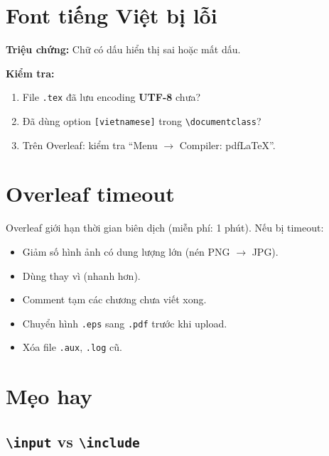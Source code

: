 \section{Font tiếng Việt bị lỗi}

\textbf{Triệu chứng:} Chữ có dấu hiển thị sai hoặc mất dấu.

\textbf{Kiểm tra:}
\begin{enumerate}
  \item File \texttt{.tex} đã lưu encoding \textbf{UTF-8} chưa?
  \item Đã dùng option \texttt{[vietnamese]} trong \verb|\documentclass|?
  \item Trên Overleaf: kiểm tra ``Menu $\rightarrow$ Compiler: pdfLaTeX''.
\end{enumerate}

\section{Overleaf timeout}

Overleaf giới hạn thời gian biên dịch (miễn phí: 1 phút). Nếu bị timeout:

\begin{itemize}
  \item Giảm số hình ảnh có dung lượng lớn (nén PNG $\rightarrow$ JPG).
  \item Dùng \verb|| thay vì \verb|| (nhanh hơn).
  \item Comment tạm các chương chưa viết xong.
  \item Chuyển hình \texttt{.eps} sang \texttt{.pdf} trước khi upload.
  \item Xóa file \texttt{.aux}, \texttt{.log} cũ.
\end{itemize}

\section{Mẹo hay}

\subsection{\texttt{\textbackslash input} vs \texttt{\textbackslash include}}

